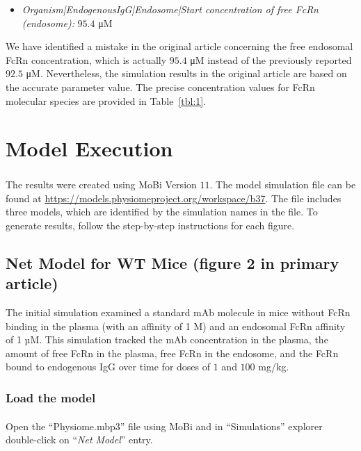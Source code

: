 \documentclass[fleqn,10pt]{physiome}
\begin{document}
\begin{itemize}
    \item \textit{Organism|EndogenousIgG|Endosome|Start concentration of free FcRn (endosome):} $95.4$ \si{\micro M}
\end{itemize}

We have identified a mistake in the original article concerning the free endosomal FcRn concentration, which is actually $95.4$ \si{\micro M} instead of the previously reported $92.5$ \si{\micro M}. Nevertheless, the simulation results in the original article are based on the accurate parameter value. The precise concentration values for FcRn molecular species are provided in Table~\ref{tbl:1}.


\section{Model Execution}

The results were created using MoBi\textsuperscript{\textregistered} Version $11$. The model simulation file can be found at \url{https://models.physiomeproject.org/workspace/b37}. The file includes three models, which are identified by the simulation names in the file. To generate results, follow the step-by-step instructions for each figure.


\subsection{Net Model for WT Mice (figure 2 in primary article)}\label{Figure2}

The initial simulation examined a standard mAb molecule in mice without FcRn binding in the plasma (with an affinity of 1 M) and an endosomal FcRn affinity of 1 µM. This simulation tracked the mAb concentration in the plasma, the amount of free FcRn in the plasma, free FcRn in the endosome, and the FcRn bound to endogenous IgG over time for doses of $1$ and $100$ mg/kg.

\subsubsection{Load the model}
Open the ``Physiome.mbp3'' file using MoBi\textsuperscript{\textregistered} and in ``Simulations'' explorer double-click on ``\textit{Net Model}'' entry.
\end{document}
